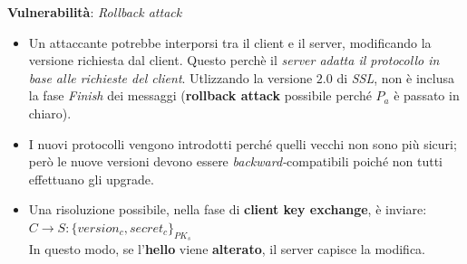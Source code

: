 \documentclass[11pt, a4paper, twoside, italian]{report}
\theoremstyle{plain}
\begin{document}
\noindent
\textbf{Vulnerabilità}: \textit{Rollback attack}
\begin{itemize}
	\item Un attaccante potrebbe interporsi tra il client e il server, modificando la versione richiesta dal client. Questo perchè il \textit{server adatta il protocollo in base alle richieste del client}. Utlizzando la versione $2.0$ di \textit{SSL}, non è inclusa la fase \textit{Finish} dei messaggi (\textbf{rollback attack} possibile perché $P_a$ è passato in chiaro).\\
	\item I nuovi protocolli vengono introdotti perché quelli vecchi non sono più sicuri; però le nuove versioni devono essere \textit{backward-}compatibili poiché non tutti effettuano gli upgrade.
	\item Una risoluzione possibile, nella fase di \textbf{client key exchange}, è inviare: ~~~$ C \rightarrow S: \{version_{c}, secret_{c} \}_{PK_{s}}$\\
	In questo modo, se l'\textbf{hello} viene \textbf{alterato}, il server capisce la modifica.
\end{itemize}
\end{document}
